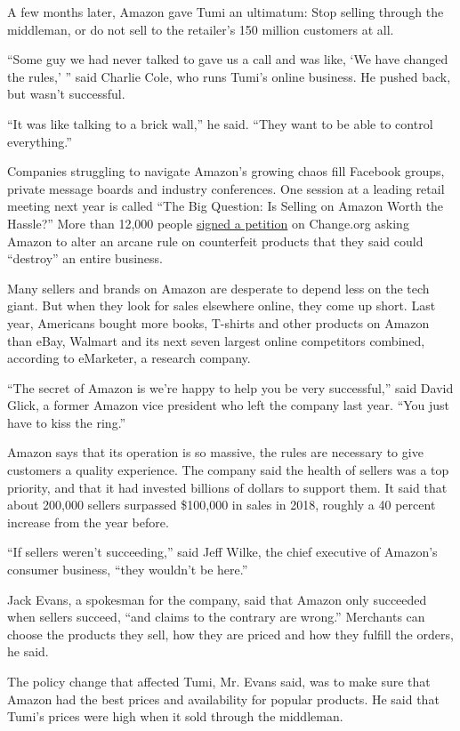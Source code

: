 A few months later, Amazon gave Tumi an ultimatum: Stop selling through
the middleman, or do not sell to the retailer's 150 million customers at
all.

``Some guy we had never talked to gave us a call and was like, `We have
changed the rules,' '' said Charlie Cole, who runs Tumi's online
business. He pushed back, but wasn't successful.

``It was like talking to a brick wall,'' he said. ``They want to be able
to control everything.''

Companies struggling to navigate Amazon's growing chaos fill Facebook
groups, private message boards and industry conferences. One session at
a leading retail meeting next year is called ``The Big Question: Is
Selling on Amazon Worth the Hassle?'' More than 12,000 people
\href{https://www.change.org/p/jeff-bezos-amazon-com-should-only-suspend-the-asin-not-the-seller}{signed
a petition} on Change.org asking Amazon to alter an arcane rule on
counterfeit products that they said could ``destroy'' an entire
business.

Many sellers and brands on Amazon are desperate to depend less on the
tech giant. But when they look for sales elsewhere online, they come up
short. Last year, Americans bought more books, T-shirts and other
products on Amazon than eBay, Walmart and its next seven largest online
competitors combined, according to eMarketer, a research company.

``The secret of Amazon is we're happy to help you be very successful,''
said David Glick, a former Amazon vice president who left the company
last year. ``You just have to kiss the ring.''

Amazon says that its operation is so massive, the rules are necessary to
give customers a quality experience. The company said the health of
sellers was a top priority, and that it had invested billions of dollars
to support them. It said that about 200,000 sellers surpassed \$100,000
in sales in 2018, roughly a 40 percent increase from the year before.

``If sellers weren't succeeding,'' said Jeff Wilke, the chief executive
of Amazon's consumer business, ``they wouldn't be here.''

Jack Evans, a spokesman for the company, said that Amazon only succeeded
when sellers succeed, ``and claims to the contrary are wrong.''
Merchants can choose the products they sell, how they are priced and how
they fulfill the orders, he said.

The policy change that affected Tumi, Mr. Evans said, was to make sure
that Amazon had the best prices and availability for popular products.
He said that Tumi's prices were high when it sold through the middleman.


